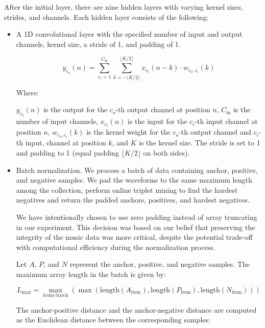 After the initial layer, there are nine hidden layers with varying kernel sizes, strides, and channels. Each hidden layer consists of the following:

\begin{itemize}
    \item A 1D convolutional layer with the specified number of input and output channels, kernel size, a stride of 1, and padding of 1.

    \begin{equation}
y_{c_o}(n) = \sum_{c_i=1}^{C_{\text{in}}} \sum_{k=-\lfloor K/2 \rfloor}^{\lfloor K/2 \rfloor} x_{c_i}(n - k) \cdot w_{c_o, c_i}(k)
\end{equation}

Where:

$y_{c_o}(n)$ is the output for the $c_o$-th output channel at position $n$, $C_{\text{in}}$ is the number of input channels, $x_{c_i}(n)$ is the input for the $c_i$-th input channel at position $n$, $w_{c_o, c_i}(k)$ is the kernel weight for the $c_o$-th output channel and $c_i$-th input, channel at position $k$, and $K$ is the kernel size. The stride is set to 1 and padding to 1 (equal padding $\lfloor K/2 \rfloor$ on both sides).

\item Batch normalization. We process a batch of data containing anchor, positive, and negative samples. We pad the waveforms to the same  maximum length among the collection, perform online triplet mining to find the hardest negatives and return the padded anchors, positives, and hardest negatives.

We have intentionally chosen to use zero padding instead of array truncating in our experiment. This decision was based on our belief that preserving the integrity of the music data was more critical, despite the potential trade-off with computational efficiency during the normalization process.

Let $A$, $P$, and $N$ represent the anchor, positive, and negative samples. The maximum array length in the batch is given by:

\begin{equation}
L_{\text{max}} = \max_{\text{item} \in \text{batch}}(\max(\text{length}(A_{\text{item}}), \text{length}(P_{\text{item}}), \text{length}(N_{\text{item}})))
\end{equation}

The anchor-positive distance and the anchor-negative distance are computed as the Euclidean distance between the corresponding samples:


\end{itemize}
